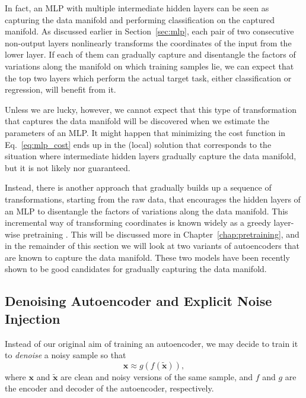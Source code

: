 \documentclass{now}
\newcommand{\vect}[1]{\mathbf{#1}}
\newcommand{\vx}[0]{\vect{x}}
\begin{document}
In fact, an MLP with multiple intermediate hidden layers can
be seen as capturing the data manifold and performing
classification on the captured manifold. As discussed
earlier in Section~\ref{sec:mlp}, each pair of two
consecutive non-output layers nonlinearly transforms the
coordinates of the input from the lower layer. If each of
them can gradually capture and disentangle the factors of
variations along the manifold on which training samples lie,
we can expect that the top two layers which perform the
actual target task, either classification or regression,
will benefit from it.

Unless we are lucky, however, we cannot expect that this type of
transformation that captures the data manifold will be discovered when we
estimate the parameters of an MLP. It might happen that minimizing the cost
function in Eq.~\eqref{eq:mlp_cost} ends up in the (local) solution that
corresponds to the situation where intermediate hidden layers gradually
capture the data manifold, but it is not likely nor guaranteed.

Instead, there is another approach that gradually builds up a
sequence of transformations, starting from the raw data, that 
encourages the hidden layers of an MLP to disentangle the factors
of variations along the data manifold.  This incremental way of
transforming coordinates is known widely as a greedy layer-wise
pretraining \citep{Hinton2006}. This will be discussed more in
Chapter~\ref{chap:pretraining}, and in the remainder of this
section we will look at two variants of autoencoders that are
known to capture the data manifold. These two models have been
recently shown to be good candidates for gradually capturing the
data manifold.


\subsection{Denoising Autoencoder and Explicit Noise
Injection}
\label{sec:dae}


Instead of our original aim of training an autoencoder, we
may decide to train it to \textit{denoise} a noisy sample so
that 
\[
\vx \approx g(f(\tilde{\vx})),
\]
where $\vx$ and $\tilde{\vx}$ are clean and noisy versions
of the same sample, and $f$ and $g$ are the encoder and
decoder of the autoencoder, respectively. 
\end{document}
